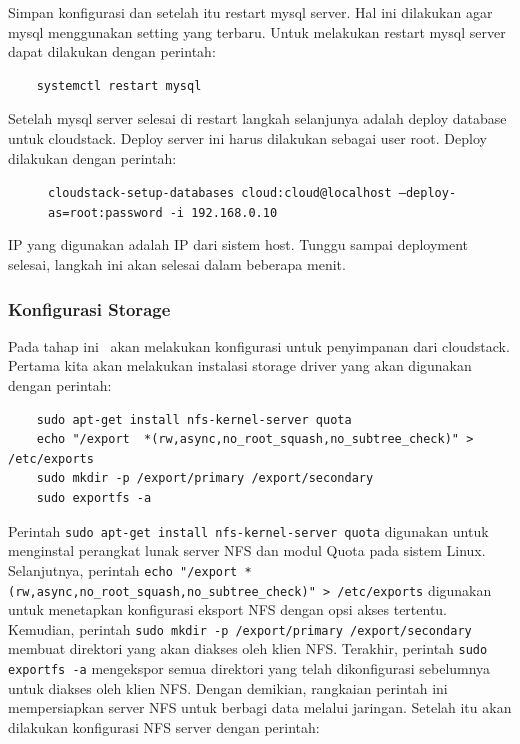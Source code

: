 Simpan konfigurasi dan setelah itu restart mysql server. Hal ini dilakukan agar mysql menggunakan setting yang terbaru. Untuk melakukan restart mysql server dapat dilakukan dengan perintah:

\begin{verbatim}
    systemctl restart mysql
\end{verbatim}

Setelah mysql server selesai di restart langkah selanjunya adalah deploy database untuk cloudstack. Deploy server ini harus dilakukan sebagai user root. Deploy dilakukan dengan perintah:

\begin{figure}
    \texttt{cloudstack-setup-databases cloud:cloud@localhost --deploy-as=root:password -i 192.168.0.10}
\end{figure}

IP yang digunakan adalah IP dari sistem host. Tunggu sampai deployment selesai, langkah ini akan selesai dalam beberapa menit.

\subsubsection{Konfigurasi Storage}
Pada tahap ini \saya\ akan melakukan konfigurasi untuk penyimpanan dari cloudstack. Pertama kita akan melakukan instalasi storage driver yang akan digunakan dengan perintah:

\begin{listing}[H]
    \begin{verbatim}
    sudo apt-get install nfs-kernel-server quota
    echo "/export  *(rw,async,no_root_squash,no_subtree_check)" > /etc/exports
    sudo mkdir -p /export/primary /export/secondary
    sudo exportfs -a
    \end{verbatim}
\end{listing}

Perintah \texttt{sudo apt-get install nfs-kernel-server quota} digunakan untuk menginstal perangkat lunak server NFS dan modul Quota pada sistem Linux. Selanjutnya, perintah \texttt{echo "/export *(rw,async,no\_root\_squash,no\_subtree\_check)" > /etc/exports} digunakan untuk menetapkan konfigurasi eksport NFS dengan opsi akses tertentu. Kemudian, perintah \texttt{sudo mkdir -p /export/primary /export/secondary} membuat direktori yang akan diakses oleh klien NFS. Terakhir, perintah \texttt{sudo exportfs -a} mengekspor semua direktori yang telah dikonfigurasi sebelumnya untuk diakses oleh klien NFS. Dengan demikian, rangkaian perintah ini mempersiapkan server NFS untuk berbagi data melalui jaringan. Setelah itu akan dilakukan konfigurasi NFS server dengan perintah:

